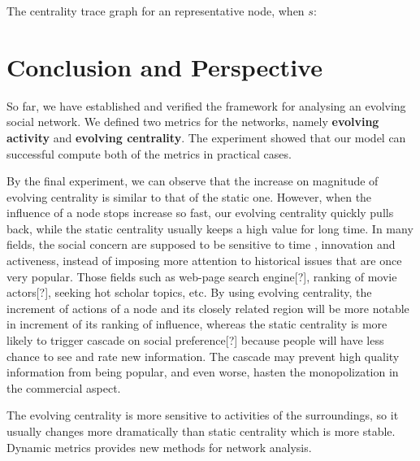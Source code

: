 \documentclass[12pt,abstract=true]{scrartcl}
\numberwithin{equation}{section}
\theoremstyle{definition}   \newtheorem{definition}{Definition}[section]
\theoremstyle{plain}        \newtheorem{theorem}{Theorem}[section]
\theoremstyle{plain}        \newtheorem{observation}{Observation}[section]
\theoremstyle{plain}        \newtheorem{fact}{Fact}[section]
\theoremstyle{plain}        \newtheorem{claim}{Claim}[section]
\theoremstyle{plain}        \newtheorem{lemma}[theorem]{Lemma}
\theoremstyle{plain}        \newtheorem{corollary}[theorem]{Corollary}
\theoremstyle{remark}       \newtheorem{example}{Example}[section]
\theoremstyle{remark}       \newtheorem{remark}{Remark}[section]
\begin{document}
The centrality trace graph for an representative node, when $s$:

\section{Conclusion and Perspective}
So far, we have established and verified the framework for analysing an
evolving social network. We defined two metrics for the networks, namely
\textbf{evolving activity} and \textbf{evolving centrality}. The
experiment showed that our model can successful compute both of the metrics in
practical cases.

By the final experiment, we can observe that the increase on magnitude of
evolving centrality is similar to that of the static one. However, when the
influence of a node stops increase so fast, our evolving centrality quickly
pulls back, while the static centrality usually keeps a high value for long
time. In many fields, the social concern are supposed to be sensitive to time
, innovation and activeness, instead of imposing more attention to historical
issues that are once very popular. Those fields such as web-page search
engine[?], ranking of movie actors[?], seeking hot scholar topics, etc.
By using evolving centrality, the increment of actions of a node and its
closely related region will be more notable in increment of its ranking of
influence, whereas the static centrality is more likely to trigger cascade on
social preference[?] because people will have less chance to see and rate new
information. The cascade may prevent high quality information from being
popular, and even worse, hasten the monopolization in the commercial aspect.

The evolving centrality is more sensitive to activities of the surroundings, so
it usually changes more dramatically than static centrality which is more
stable. Dynamic metrics provides new methods for network analysis.



\end{document}
